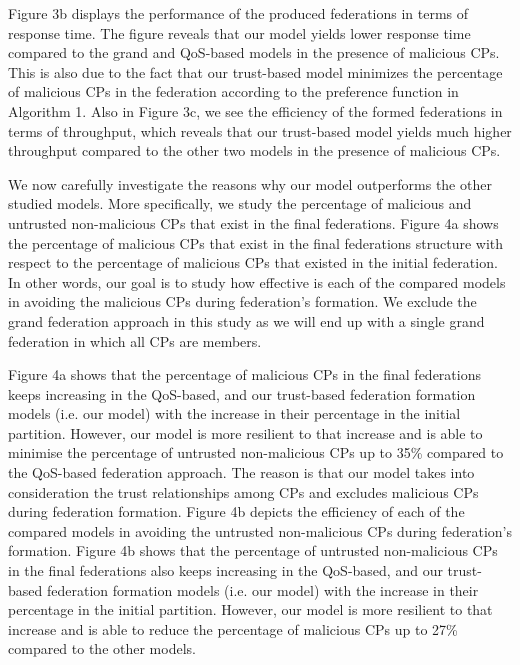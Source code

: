 \documentclass[preprint]{elsarticle}
\theoremstyle{definition}
\theoremstyle{remark}
\theoremstyle{property}
\begin{document}
Figure 3b displays the performance of the produced federations
in terms of response time. The figure reveals that our
model yields lower response time compared to the
grand and QoS-based models in the presence of
malicious CPs. This is also due to the fact that our trust-based
model minimizes the percentage of malicious
CPs in the federation according to the preference function in Algorithm 1. Also in Figure 3c, we see the efficiency of the
formed federations in terms of throughput, which reveals
that our trust-based model yields much higher throughput
compared to the other two models in the presence of
malicious CPs.

We now carefully investigate the reasons why our model outperforms the other
studied models. More specifically, we study the percentage of malicious and untrusted non-malicious CPs that exist in the final federations. Figure 4a shows the percentage of malicious CPs that exist in the final federations structure with respect to the percentage of malicious CPs that existed in the initial federation. In other words, our goal is to study how effective is each of the compared models in avoiding the malicious CPs during federation’s formation. We exclude the grand federation approach in this study as we will end up with a single grand federation in which all CPs are members.

Figure 4a shows that the percentage of malicious CPs in the final federations keeps increasing in the QoS-based, and
our trust-based federation formation models (i.e. our model) with the increase in their percentage in the initial partition. However, our model is more resilient to that increase and is able to minimise the percentage of untrusted non-malicious CPs up to 35\% compared to the QoS-based federation approach. The reason is that our model takes into consideration the trust relationships among CPs and excludes malicious CPs during federation formation. Figure 4b depicts the efficiency of each of the compared models in avoiding the untrusted non-malicious CPs during federation’s formation. Figure 4b shows that the percentage of untrusted non-malicious CPs in the final federations also keeps increasing in the QoS-based, and our trust-based federation formation models (i.e. our model) with the increase in their percentage in the initial partition. However, our model is more resilient to that increase and is able to reduce the percentage of malicious CPs up to 27\% compared to the other models.
\end{document}
